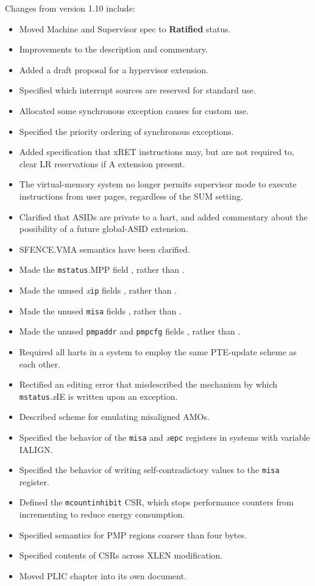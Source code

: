 Changes from version 1.10 include:
\vspace{-0.2in}
\begin{itemize}
  \parskip 0pt
  \itemsep 1pt
  \item Moved Machine and Supervisor spec to {\bf Ratified} status.
\item Improvements to the description and commentary.
\item Added a draft proposal for a hypervisor extension.
\item Specified which interrupt sources are reserved for standard use.
\item Allocated some synchronous exception causes for custom use.
\item Specified the priority ordering of synchronous exceptions.
\item Added specification that xRET instructions may, but are not
  required to, clear LR reservations if A extension present.
\item The virtual-memory system no longer permits supervisor mode to execute
  instructions from user pages, regardless of the SUM setting.
\item Clarified that ASIDs are private to a hart, and added commentary about
  the possibility of a future global-ASID extension.
\item SFENCE.VMA semantics have been clarified.
\item Made the {\tt mstatus}.MPP field \warl, rather than \wlrl.
\item Made the unused {\em x}{\tt ip} fields \wpri, rather than \wiri.
\item Made the unused {\tt misa} fields \wlrl, rather than \wiri.
\item Made the unused {\tt pmpaddr} and {\tt pmpcfg} fields \warl, rather than \wiri.
\item Required all harts in a system to employ the same PTE-update scheme as each other.
\item Rectified an editing error that misdescribed the mechanism by which
  {\tt mstatus}.{\em x}IE is written upon an exception.
\item Described scheme for emulating misaligned AMOs.
\item Specified the behavior of the {\tt misa} and {\em x}{\tt epc} registers in
  systems with variable IALIGN.
\item Specified the behavior of writing self-contradictory values to the
  {\tt misa} register.
\item Defined the {\tt mcountinhibit} CSR, which stops performance
  counters from incrementing to reduce energy consumption.
\item Specified semantics for PMP regions coarser than four bytes.
\item Specified contents of CSRs across XLEN modification.
\item Moved PLIC chapter into its own document.
\end{itemize}

